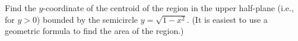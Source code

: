 \documentclass{ximera}
\begin{document}
\begin{question}%

Find the \(y\)-coordinate of the centroid of the region in the upper half-plane (i.e., for \(y > 0\)) bounded by the semicircle \(y = \sqrt{1-x^2}\). (It is easiest to use a geometric formula to find the area of the region.)
\begin{multiplechoice}
\end{multiplechoice}

\end{question}
\end{document}
